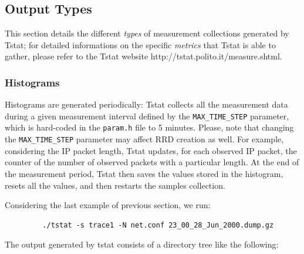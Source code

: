 \documentclass[11pt]{article}
\begin{document}
\subsection{Output Types\label{Output_Types}}


This section details the different \textit{types} of measurement collections
generated by Tstat; for detailed informations on  the specific \textit{metrics} 
that Tstat is able to gather, please refer to the Tstat website 
\textsf{http://tstat.polito.it/measure.shtml}.

\subsubsection{Histograms\label{Histograms}}


Histograms are generated periodically: Tstat collects all the
measurement data during a given measurement interval defined by the \texttt{MAX\_TIME\_STEP} 
parameter, which is hard-coded in the \texttt{param.h} file to 5 minutes. Please, note
that changing the \texttt{MAX\_TIME\_STEP} parameter may affect RRD creation as well.
For example, considering the IP packet length, Tstat updates, for
each observed IP packet, the counter of the number of observed packets with a
particular length. At the end of the measurement period, Tstat then saves
the values stored in the histogram, resets all the values, and then restarts 
the samples collection.



Considering the last example of previous section, we run:

\begin{small}\begin{verbatim}
         ./tstat -s trace1 -N net.conf 23_00_28_Jun_2000.dump.gz
\end{verbatim}\end{small} \noindent
The output generated by tstat consists of a directory tree like the following:
\end{document}
